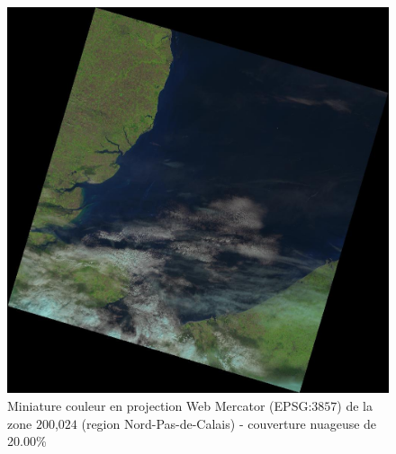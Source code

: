 \documentclass{book}
\begin{document}
\begin{figure}[H]
\begin{center}
\includegraphics[scale=0.2]{images/LC82000242013271LGN00.jpg}
\end{center}
\caption{Miniature couleur en projection Web Mercator (EPSG:$3857$) de la zone $200$,$024$ (region Nord-Pas-de-Calais) - couverture nuageuse de 20.00\% }
\label{cloud1}
\end{figure}
\end{document}
